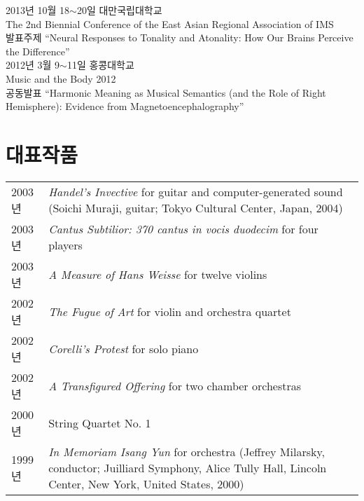 \documentclass[dvipdfmx,a4paper]{article}
\begin{document}
  \noindent 2013년 10월 18$\sim$20일 대만국립대학교\\
  The 2nd Biennial Conference of the East Asian Regional Association of IMS\\
  발표주제 “Neural Responses to Tonality and Atonality: How Our Brains Perceive the Difference”\\
  
  \noindent 2012년 3월 9$\sim$11일 홍콩대학교\\
  Music and the Body 2012\\
  공동발표 “Harmonic Meaning as Musical Semantics (and the Role of Right Hemisphere): Evidence from Magnetoencephalography”
  
  \vspace{2.5mm}
  
  \section*{\normalsize 대표작품}
  
  \hspace*{-0.25cm}
  \begin{tabular}{p{1.5cm} p{12.5cm}}
    2003년 & \textit{Handel’s Invective} for guitar and computer-generated sound (Soichi Muraji, guitar; Tokyo Cultural Center, Japan, 2004)\\[0.5mm]
    
    2003년 & \textit{Cantus Subtilior: 370 cantus in vocis duodecim} for four
    players\\[0.5mm]
    
    2003년 & \textit{A Measure of Hans Weisse} for twelve violins\\[0.5mm]
    
    2002년 & \textit{The Fugue of Art} for violin and orchestra quartet\\[0.5mm]
    
    2002년 & \textit{Corelli’s Protest} for solo piano\\[0.5mm]
    
    2002년 & \textit{A Transfigured Offering} for two chamber orchestras\\[0.5mm]
    
    2000년 & String Quartet No. 1\\[0.5mm]
    
    1999년 & \textit{In Memoriam Isang Yun} for orchestra (Jeffrey Milarsky, conductor; Juilliard Symphony, Alice Tully Hall, Lincoln Center, New York, United States, 2000)
  \end{tabular}
  
\end{document}
